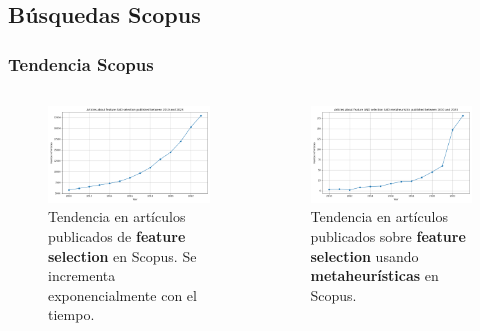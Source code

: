 \subsection{Búsquedas Scopus}
\begin{frame}
  \frametitle{Tendencia Scopus}
  \begin{columns}
    \begin{figure}
      \begin{center}
        \includegraphics[width=\textwidth]{imagenes/chapter3/scopus_chart.png}
      \end{center}
      \caption{Tendencia en artículos publicados de \textbf{feature selection} en Scopus. Se incrementa exponencialmente con el tiempo.}
    \end{figure}

    \begin{figure}
      \begin{center}
        \includegraphics[width=\textwidth]{imagenes/chapter3/scopus_chart2.png}
      \end{center}
      \caption{Tendencia en artículos publicados sobre \textbf{feature selection} usando \textbf{metaheurísticas} en Scopus.}
    \end{figure}
  \end{columns}
\end{frame}

